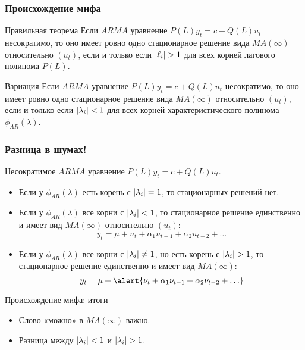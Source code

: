 \begin{frame}
    \frametitle{Происхождение мифа}
  
    \begin{block}{Правильная теорема}
      Если $ARMA$ уравнение $P(L) y_t = c + Q(L) u_t$ несократимо, то оно 
       имеет ровно одно стационарное решение \alert{вида $MA(\infty)$ относительно $(u_t)$}, 
        если и только если $\abs{\ell_i} > 1$ для всех корней лагового полинома $P(L)$.
    \end{block}
  
    \pause
    \begin{block}{Вариация}
      Если $ARMA$ уравнение $P(L) y_t = c + Q(L) u_t$ несократимо, то оно 
       имеет ровно одно стационарное решение \alert{вида $MA(\infty)$ относительно $(u_t)$}, 
        если и только если $\abs{\lambda_i} < 1$ для всех корней характеристического полинома $\phi_{AR}(\lambda)$.
    \end{block}
  \end{frame}
  
  
  
  \begin{frame}
    \frametitle{Разница в шумах!}
    
    Несократимое $ARMA$ уравнение $P(L) y_t = c + Q(L)u_t$.
  \pause
    \begin{itemize}[<+->]
      \item Если у $\phi_{AR}(\lambda)$ есть корень с $\abs{\lambda_i} = 1$,
      \pause
      то стационарных решений нет. 
      \pause
      \item Если у $\phi_{AR}(\lambda)$ все корни с $\abs{\lambda_i} < 1$,
      \pause
      то стационарное решение единственно и имеет вид $MA(\infty)$ относительно $(u_t)$:
      \[
        y_t = \mu + u_t + \alpha_1 u_{t-1} + \alpha_2 u_{t-2} +\ldots 
      \]
      \pause
      \item Если у $\phi_{AR}(\lambda)$ все корни с $\abs{\lambda_i} \neq 1$,
      но есть корень с $\abs{\lambda_i} > 1$,
      \pause
      то стационарное решение единственно и \alert{имеет вид $MA(\infty)$}:
      \[
        y_t = \mu +  \alert{\nu_t + \alpha_1 \nu_{t-1} + \alpha_2 \nu_{t-2} +\ldots}
      \]
  
    \end{itemize}
  
    
  
  \end{frame}
  



\begin{frame}{Происхождение мифа: итоги}

  \begin{itemize}[<+->]
    \item Слово «\alert{можно}» в $MA(\infty)$ важно. 
    \item Разница между $\abs{\lambda_i} < 1$ и $\abs{\lambda_i} > 1$.
  \end{itemize}
\end{frame}



